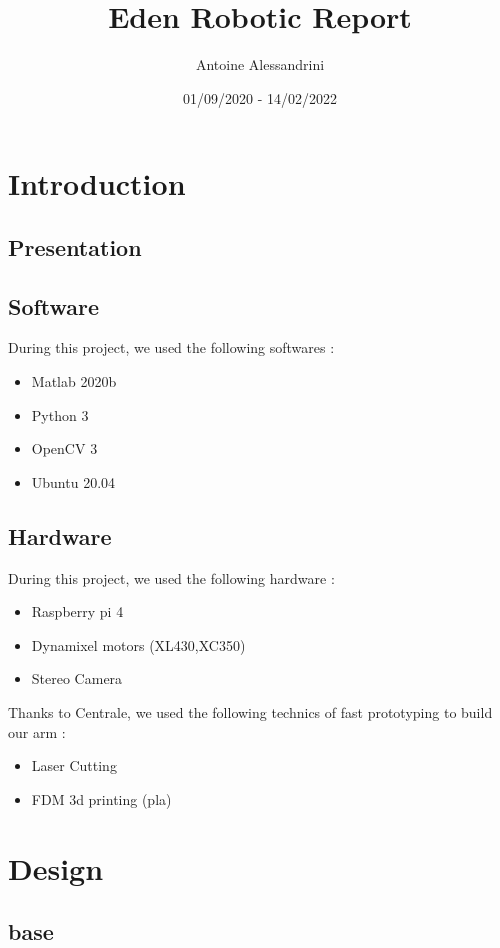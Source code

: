 \documentclass[12pt]{report}
\title{Eden Robotic Report}
\author{Antoine Alessandrini}
\date{01/09/2020 - 14/02/2022}
\begin{document}
 \maketitle
 \tableofcontents
 
\newpage
\chapter*{Introduction}
\section{Presentation}

\section{Software}
During this project, we used the following softwares :

\begin{itemize}
    \item Matlab 2020b
    \item Python 3
    \item OpenCV 3
    \item Ubuntu 20.04
\end{itemize}

\section{Hardware}
During this project, we used the following hardware :

\begin{itemize}
    \item Raspberry pi 4
    \item Dynamixel motors (XL430,XC350)
    \item Stereo Camera
\end{itemize}

\noindent Thanks to Centrale, we used the following technics of fast prototyping to build our arm :
\begin{itemize}
    \item Laser Cutting
    \item FDM 3d printing (pla)
\end{itemize}


\newpage
\chapter{Design}
\section{base}
\end{document}
